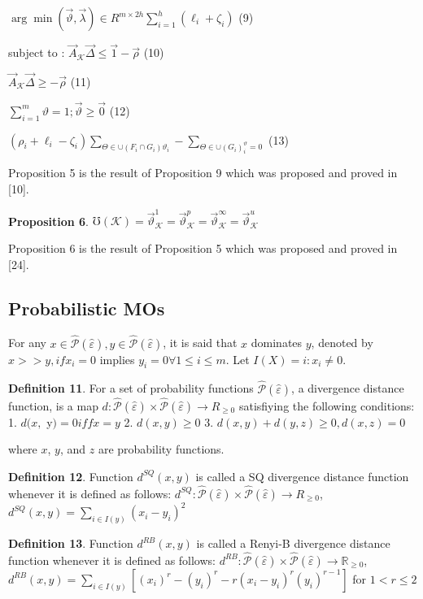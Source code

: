 \documentclass[]{iosart2c}
\begin{document}
$\arg \min(\vec{\vartheta},\vec{\lambda})\in R^{m \times 2h}\sum^h_{i=1}(\ell_i + \zeta_i)$ (9)

subject to : $\vec{A}_\mathcal{K} \vec{\Delta} \le \vec{1} - \vec{\rho}$ (10)

$\vec{A}_\mathcal{K} \vec\Delta\geq -\vec{\rho}$ (11)

$\sum^m_{i=1} \vartheta = 1;\vec{\vartheta}\geq\vec{0}$ (12)

$(\rho_i + \ell_i - \zeta_i)\sum_{\Theta \in \cup(F_i \cap G_i)\vartheta_i} - \sum_{\Theta\in\cup(G_i)^\vartheta_i=0}$ (13)

Proposition 5 is the result of Proposition 9 which  was proposed and proved in [10].

\textbf{Proposition 6}. $\mho(\mathcal{K}) = \vec{\vartheta}^1_\mathcal{K} = \vec{\vartheta}^p_\mathcal{K} = \vec{\vartheta}^\infty_\mathcal{K} = \vec{\vartheta}^u_\mathcal{K}$

Proposition 6 is the result of Proposition 5 which was proposed and proved in [24].

\subsection{Probabilistic MOs}

For any $x \in \hat{\mathcal{P}}(\hat{\varepsilon}), y \in \hat{\mathcal{P}}(\hat{\varepsilon})$, it is said that $x$ dominates $y$, denoted by $x >> y, if x_i = 0$ implies $y_i = 0 \forall 1 \le i \le m$. Let $I(X) = {i : x_i \neq 0}$. 

\textbf{Definition 11}. For a set of probability functions $\hat{\mathcal{P}} (\hat{\varepsilon})$, a divergence distance function, is a map $d : \hat{\mathcal{P}} (\hat{\varepsilon}) \times \hat{\mathcal{P}} (\hat{\varepsilon}) \to R_{\geq0}$ satisfiying the following conditions: 
1. $d(x,$ y$) = 0 iff x = y$ 
2. $d(x, y) \geq 0$
3. $d(x, y) + d(y, z)\ge0, d(x, z) = 0$

where $x$, $y$, and $z$ are probability functions. 

\textbf{Definition 12}. Function $d^{SQ}(x, y)$ is called a SQ divergence distance function whenever it is defined as follows: $d^{SQ} : \hat{\mathcal{P}} (\hat{\varepsilon}) \times \hat{\mathcal{P}} (\hat{\varepsilon}) \to R_{\geq0}$, $d^{SQ}(x, y) = \sum_{i \in I(y)} (x_i - y_i)^2$

\textbf{Definition 13}. Function $d^{RB}(x, y)$ is called a Renyi-B divergence distance function whenever it is defined as follows: $d^{RB} : \hat{\mathcal{P}}(\hat{\varepsilon}) \times \hat{\mathcal{P}} (\hat{\varepsilon}) \to \mathbb{R}_{\ge 0}$, $d^{RB}(x, y)=\sum_{i\in I(y)}[(x_i)^r - (y_i)^r - r(x_i - y_i)^r(y_i)^{r-1}]$ for $1 < r \le 2$
 
\end{document}
